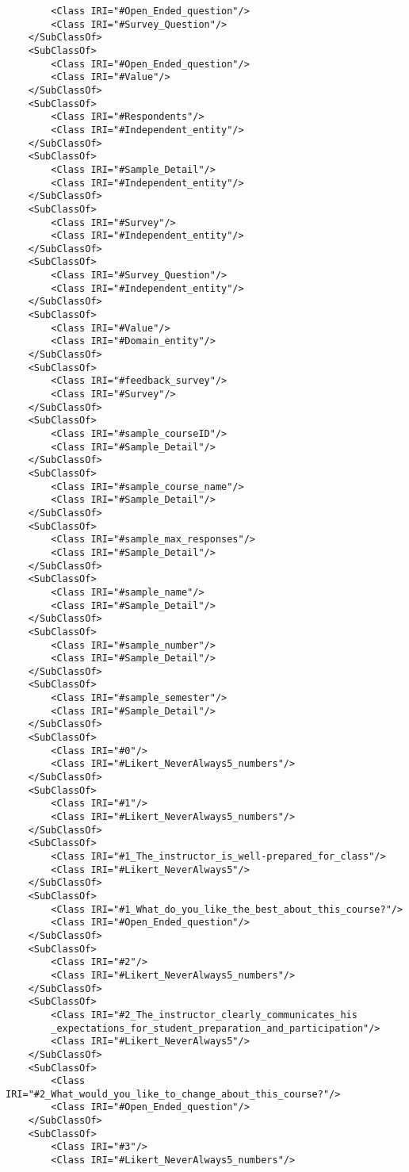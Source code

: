 \begin{lstlisting}
        <Class IRI="#Open_Ended_question"/>
        <Class IRI="#Survey_Question"/>
    </SubClassOf>
    <SubClassOf>
        <Class IRI="#Open_Ended_question"/>
        <Class IRI="#Value"/>
    </SubClassOf>
    <SubClassOf>
        <Class IRI="#Respondents"/>
        <Class IRI="#Independent_entity"/>
    </SubClassOf>
    <SubClassOf>
        <Class IRI="#Sample_Detail"/>
        <Class IRI="#Independent_entity"/>
    </SubClassOf>
    <SubClassOf>
        <Class IRI="#Survey"/>
        <Class IRI="#Independent_entity"/>
    </SubClassOf>
    <SubClassOf>
        <Class IRI="#Survey_Question"/>
        <Class IRI="#Independent_entity"/>
    </SubClassOf>
    <SubClassOf>
        <Class IRI="#Value"/>
        <Class IRI="#Domain_entity"/>
    </SubClassOf>
    <SubClassOf>
        <Class IRI="#feedback_survey"/>
        <Class IRI="#Survey"/>
    </SubClassOf>
    <SubClassOf>
        <Class IRI="#sample_courseID"/>
        <Class IRI="#Sample_Detail"/>
    </SubClassOf>
    <SubClassOf>
        <Class IRI="#sample_course_name"/>
        <Class IRI="#Sample_Detail"/>
    </SubClassOf>
    <SubClassOf>
        <Class IRI="#sample_max_responses"/>
        <Class IRI="#Sample_Detail"/>
    </SubClassOf>
    <SubClassOf>
        <Class IRI="#sample_name"/>
        <Class IRI="#Sample_Detail"/>
    </SubClassOf>
    <SubClassOf>
        <Class IRI="#sample_number"/>
        <Class IRI="#Sample_Detail"/>
    </SubClassOf>
    <SubClassOf>
        <Class IRI="#sample_semester"/>
        <Class IRI="#Sample_Detail"/>
    </SubClassOf>
    <SubClassOf>
        <Class IRI="#0"/>
        <Class IRI="#Likert_NeverAlways5_numbers"/>
    </SubClassOf>
    <SubClassOf>
        <Class IRI="#1"/>
        <Class IRI="#Likert_NeverAlways5_numbers"/>
    </SubClassOf>
    <SubClassOf>
        <Class IRI="#1_The_instructor_is_well-prepared_for_class"/>
        <Class IRI="#Likert_NeverAlways5"/>
    </SubClassOf>
    <SubClassOf>
        <Class IRI="#1_What_do_you_like_the_best_about_this_course?"/>
        <Class IRI="#Open_Ended_question"/>
    </SubClassOf>
    <SubClassOf>
        <Class IRI="#2"/>
        <Class IRI="#Likert_NeverAlways5_numbers"/>
    </SubClassOf>
    <SubClassOf>
        <Class IRI="#2_The_instructor_clearly_communicates_his
        _expectations_for_student_preparation_and_participation"/>
        <Class IRI="#Likert_NeverAlways5"/>
    </SubClassOf>
    <SubClassOf>
        <Class IRI="#2_What_would_you_like_to_change_about_this_course?"/>
        <Class IRI="#Open_Ended_question"/>
    </SubClassOf>
    <SubClassOf>
        <Class IRI="#3"/>
        <Class IRI="#Likert_NeverAlways5_numbers"/>

\end{lstlisting}
